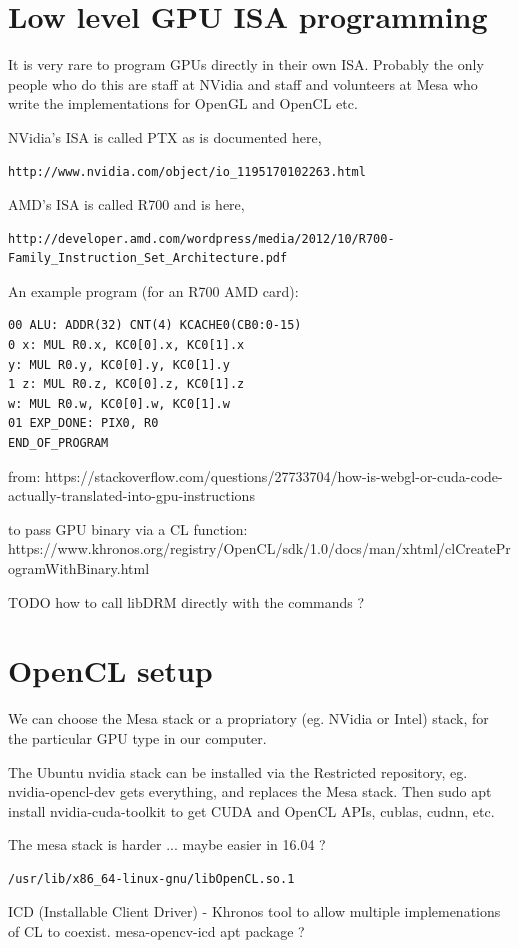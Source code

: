 \documentclass[oneside,english]{scrbook}
\begin{document}
\section{Low level GPU ISA programming}

It is very rare to program GPUs directly in their own ISA.  Probably the only people who do this are staff at NVidia and staff and volunteers at Mesa who write the implementations for OpenGL and OpenCL etc.

NVidia's ISA is called PTX as is documented here,
\begin{lstlisting}
http://www.nvidia.com/object/io_1195170102263.html
\end{lstlisting}

AMD's ISA is called R700 and is here,
\begin{lstlisting}
http://developer.amd.com/wordpress/media/2012/10/R700-Family_Instruction_Set_Architecture.pdf
\end{lstlisting}

An example program (for an R700 AMD card):

\begin{lstlisting}
00 ALU: ADDR(32) CNT(4) KCACHE0(CB0:0-15)   
0 x: MUL R0.x, KC0[0].x, KC0[1].x    
y: MUL R0.y, KC0[0].y, KC0[1].y
1 z: MUL R0.z, KC0[0].z, KC0[1].z
w: MUL R0.w, KC0[0].w, KC0[1].w
01 EXP_DONE: PIX0, R0
END_OF_PROGRAM
\end{lstlisting}

from:
https://stackoverflow.com/questions/27733704/how-is-webgl-or-cuda-code-actually-translated-into-gpu-instructions

to pass GPU binary via a CL function:
https://www.khronos.org/registry/OpenCL/sdk/1.0/docs/man/xhtml/clCreateProgramWithBinary.html


TODO how to call libDRM directly with the commands ?
\section{OpenCL setup}
We can choose the Mesa stack or a propriatory (eg. NVidia or Intel) stack, for the particular GPU type in our computer.

The Ubuntu nvidia stack can be installed via the Restricted repository, eg. nvidia-opencl-dev gets everything, and replaces the Mesa stack.  Then sudo apt install nvidia-cuda-toolkit to get CUDA and OpenCL APIs, cublas, cudnn, etc.

The mesa stack is harder ...  maybe easier in 16.04 ?
\begin{lstlisting}
/usr/lib/x86_64-linux-gnu/libOpenCL.so.1
\end{lstlisting}
ICD (Installable Client Driver) - Khronos tool to allow multiple implemenations of CL to coexist.
mesa-opencv-icd  apt package ?
\end{document}
